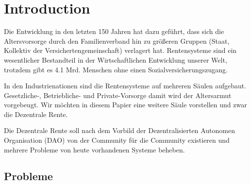 \section{Introduction}


Die Entwicklung in den letzten 150 Jahren hat dazu geführt, dass sich die Altersvorsorge durch den Familienverband hin zu größeren Gruppen (Staat, Kollektiv der Versichertengemeinschaft) verlagert hat. Rentensysteme sind ein wesentlicher Bestandteil in der Wirtschaftlichen Entwicklung unserer Welt, trotzdem gibt es 4.1 Mrd. Menschen ohne einen Sozialversicherungszugang.\cite{ilo}

In den Industrienationen sind die Rentensysteme auf mehreren Säulen aufgebaut. Gesetzliche-, Betriebliche- und Private-Vorsorge damit wird der Altersarmut vorgebeugt. Wir möchten in diesem Papier eine weitere Säule vorstellen und zwar die Dezentrale Rente. 

Die Dezentrale Rente soll nach dem Vorbild der Dezentralisierten Autonomen Organisation (DAO) von der Community für die Community existieren und mehrere  Probleme von heute vorhandenen Systeme beheben.

\subsection{Probleme}

